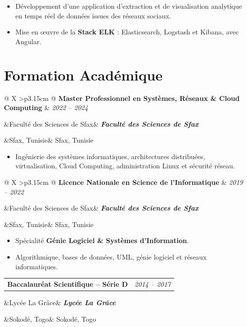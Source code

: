 \documentclass[10pt,a4paper]{article}
\makeatletter
\newcommand{\cventry}[4]{%
    \needspace{4\baselineskip}%
    \noindent
    \begin{tabularx}{\linewidth}{
        @{}
        X
        >{\raggedleft\arraybackslash}p{3.15cm}
        @{}
    }
        \textbf{\large #1}
        &
        {\small\color{secondary}\textit{#2}}
    \end{tabularx}
    \par
    \ifx&#3&
    \else
        \noindent
        \textbf{\textit{#3}}
        \par
    \fi
    \ifx&#4&
    \else
        \noindent
        {\small #4}
        \par
    \fi
    \vspace{2.5pt}%
}
\makeatother
\begin{document}
\begin{itemize}

    \item Développement d'une application d'extraction et de visualisation
    analytique en temps réel de données issues des réseaux sociaux.

    \item Mise en œuvre de la \textbf{Stack ELK} :
    Elasticsearch, Logstash et Kibana, avec Angular.

\end{itemize}


\section{Formation Académique}

\cventry
{Master Professionnel en Systèmes, Réseaux \& Cloud Computing}
{2022 -- 2024}
{Faculté des Sciences de Sfax}
{Sfax, Tunisie}

\begin{itemize}

    \item Ingénierie des systèmes informatiques, architectures distribuées,
    virtualisation, Cloud Computing, administration Linux et sécurité réseau.

\end{itemize}

\cventry
{Licence Nationale en Science de l'Informatique}
{2019 -- 2022}
{Faculté des Sciences de Sfax}
{Sfax, Tunisie}

\begin{itemize}

    \item Spécialité \textbf{Génie Logiciel \& Systèmes d'Information}.

    \item Algorithmique, bases de données, UML, génie logiciel
    et réseaux informatiques.

\end{itemize}

\cventry
{Baccalauréat Scientifique -- Série D}
{2014 -- 2017}
{Lycée La Grâce}
{Sokodé, Togo}

\end{document}
